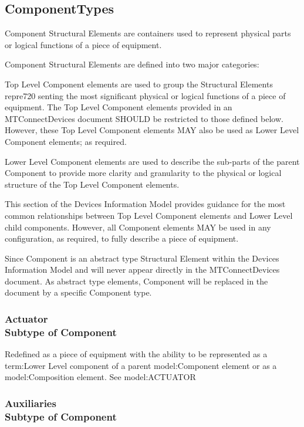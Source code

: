 \subsection{ComponentTypes} \label{model:ComponentTypes}

Component Structural Elements are containers used to represent physical parts or logical functions of a piece of equipment.

Component Structural Elements are defined into two major categories:

	Top Level Component elements are used to group the Structural Elements repre720 senting the most significant physical or logical functions of a piece of equipment. The Top Level Component elements provided in an MTConnectDevices document SHOULD be restricted to those defined below. However, these Top Level Component elements MAY also be used as Lower Level Component elements; as required.

	Lower Level Component elements are used to describe the sub-parts of the parent Component to provide more clarity and granularity to the physical or logical structure of the Top Level Component elements.

This section of the Devices Information Model provides guidance for the most common relationships between Top Level Component elements and Lower Level child components. However, all Component elements MAY be used in any configuration, as required, to fully describe a piece of equipment.

Since Component is an abstract type Structural Element within the Devices Information Model and will never appear directly in the MTConnectDevices document. As abstract type elements, Component will be replaced in the document by a specific Component type.

\subsubsection[Actuator]{Actuator \\ {\small Subtype of Component}}
  \label{type:Actuator}

\FloatBarrier

Redefined as a piece of equipment with the ability to be represented as a {term:Lower Level} component of a parent {model:Component} element or as a {model:Composition} element. See {model:ACTUATOR}

\FloatBarrier
\subsubsection[Auxiliaries]{Auxiliaries \\ {\small Subtype of Component}}
  \label{type:Auxiliaries}


